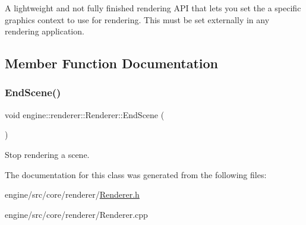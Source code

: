 A lightweight and not fully finished rendering A\+PI that lets you set the a specific graphics context to use for rendering. This must be set externally in any rendering application. 

\subsection{Member Function Documentation}
\mbox{\label{classengine_1_1renderer_1_1Renderer_aabecab3b2aea9d925bd7449c7f85539b}} 
\subsubsection{\texorpdfstring{End\+Scene()}{EndScene()}}
{\footnotesize\ttfamily void engine\+::renderer\+::\+Renderer\+::\+End\+Scene (\begin{DoxyParamCaption}{ }\end{DoxyParamCaption})\hspace{0.3cm}{\ttfamily [static]}}

Stop rendering a scene. 

The documentation for this class was generated from the following files\+:\begin{DoxyCompactItemize}
\item 
engine/src/core/renderer/\hyperlink{Renderer_8h}{Renderer.\+h}\item 
engine/src/core/renderer/Renderer.\+cpp\end{DoxyCompactItemize}
